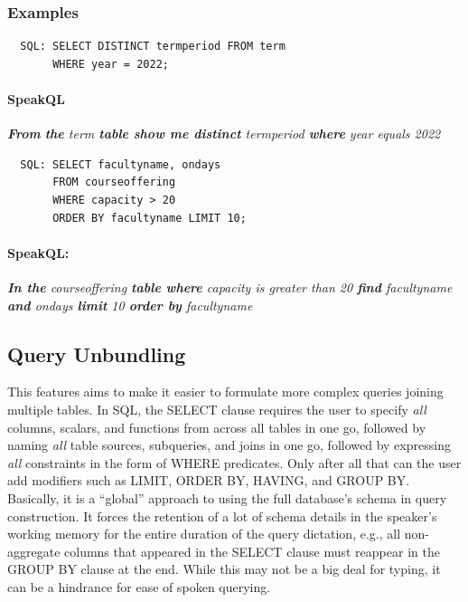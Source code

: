 \subsubsection{\textbf{Examples}}

\begin{verbatim}
  SQL: SELECT DISTINCT termperiod FROM term 
       WHERE year = 2022;
\end{verbatim}
\paragraph{SpeakQL} \emph{\textbf{From} \textbf{the} term \textbf{table show me distinct} termperiod  \textbf{where} year equals 2022}

\vspace{2mm}
\begin{verbatim}
  SQL: SELECT facultyname, ondays 
       FROM courseoffering 
       WHERE capacity > 20 
       ORDER BY facultyname LIMIT 10;
\end{verbatim}
\paragraph{SpeakQL:} \emph{\textbf{In the} courseoffering \textbf{table where} capacity is greater than 20 \textbf{find} facultyname \textbf{and} ondays \textbf{limit} 10 \textbf{order by} facultyname}


\subsection{Query Unbundling}

This features aims to make it easier to formulate more complex queries joining multiple tables. 
In SQL, the SELECT clause requires the user to specify \textit{all} columns, scalars, and functions from across all tables in one go, followed by naming \textit{all} table sources, subqueries, and joins in one go, followed by expressing \textit{all} constraints in the form of WHERE predicates. 
Only after all that can the user add modifiers such as LIMIT, ORDER BY, HAVING, and GROUP BY. 
Basically, it is a ``global'' approach to using the full database's schema in query construction.
It forces the retention of a lot of schema details in the speaker's working memory for the entire duration of the query dictation, e.g., all non-aggregate columns that appeared in the SELECT clause must reappear in the GROUP BY clause at the end.
While this may not be a big deal for typing, it can be a hindrance for ease of spoken querying.

